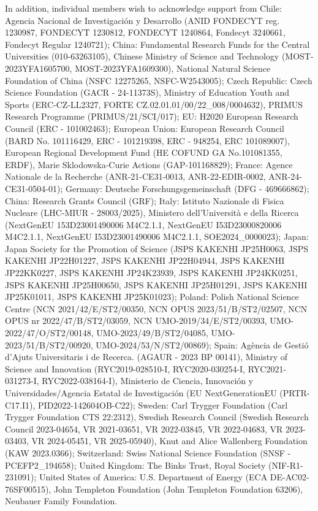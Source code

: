 \documentclass[PAPER, cernpreprint=true, atlasdraft=false, UKenglish, texmf, orcidlogo]{atlasdoc}
\begin{document}
In addition, individual members wish to acknowledge support from Chile: Agencia Nacional de Investigaci\'on y Desarrollo (ANID FONDECYT reg. 1230987, FONDECYT 1230812, FONDECYT 1240864, Fondecyt 3240661, Fondecyt Regular 1240721); China: Fundamental Research Funds for the Central Universities (010-63263105), Chinese Ministry of Science and Technology (MOST-2023YFA1605700, MOST-2023YFA1609300), National Natural Science Foundation of China (NSFC 12275265, NSFC-W2543005); Czech Republic: Czech Science Foundation (GACR - 24-11373S), Ministry of Education Youth and Sports (ERC-CZ-LL2327, FORTE CZ.02.01.01/00/22\_008/0004632), PRIMUS Research Programme (PRIMUS/21/SCI/017); EU: H2020 European Research Council (ERC - 101002463); European Union: European Research Council (BARD No. 101116429, ERC - 101219398, ERC - 948254, ERC 101089007), European Regional Development Fund (HE COFUND GA No.101081355, ERDF), Marie Sklodowska-Curie Actions (GAP-101168829); France: Agence Nationale de la Recherche (ANR-21-CE31-0013, ANR-22-EDIR-0002, ANR-24-CE31-0504-01); Germany: Deutsche Forschungsgemeinschaft (DFG - 469666862); China: Research Grants Council (GRF); Italy: Istituto Nazionale di Fisica Nucleare (LHC-MIUR - 28003/2025), Ministero dell'Università e della Ricerca (NextGenEU 153D23001490006 M4C2.1.1, NextGenEU I53D23000820006 M4C2.1.1, NextGenEU I53D23001490006 M4C2.1.1, SOE2024\_0000023); Japan: Japan Society for the Promotion of Science (JSPS KAKENHI  JP25H0063, JSPS KAKENHI JP22H01227, JSPS KAKENHI JP22H04944, JSPS KAKENHI JP22KK0227, JSPS KAKENHI JP24K23939, JSPS KAKENHI JP24KK0251, JSPS KAKENHI JP25H00650, JSPS KAKENHI JP25H01291, JSPS KAKENHI JP25K01011, JSPS KAKENHI JP25K01023); Poland: Polish National Science Centre (NCN 2021/42/E/ST2/00350, NCN OPUS 2023/51/B/ST2/02507, NCN OPUS nr 2022/47/B/ST2/03059, NCN UMO-2019/34/E/ST2/00393, UMO-2022/47/O/ST2/00148, UMO-2023/49/B/ST2/04085, UMO-2023/51/B/ST2/00920, UMO-2024/53/N/ST2/00869); Spain: Agència de Gestió d'Ajuts Universitaris i de Recerca. (AGAUR - 2023 BP 00141), Ministry of Science and Innovation (RYC2019-028510-I, RYC2020-030254-I, RYC2021-031273-I, RYC2022-038164-I), Ministerio de Ciencia, Innovación y Universidades/Agencia Estatal de Investigaci\'on (EU NextGenerationEU (PRTR-C17.I1), PID2022-142604OB-C22); Sweden: Carl Trygger Foundation (Carl Trygger Foundation CTS 22:2312), Swedish Research Council (Swedish Research Council 2023-04654, VR 2021-03651, VR 2022-03845, VR 2022-04683, VR 2023-03403, VR 2024-05451, VR 2025-05940), Knut and Alice Wallenberg Foundation (KAW 2023.0366); Switzerland: Swiss National Science Foundation (SNSF - PCEFP2\_194658); United Kingdom: The Binks Trust, Royal Society (NIF-R1-231091); United States of America: U.S. Department of Energy (ECA DE-AC02-76SF00515), John Templeton Foundation (John Templeton Foundation 63206), Neubauer Family Foundation.
\end{document}
